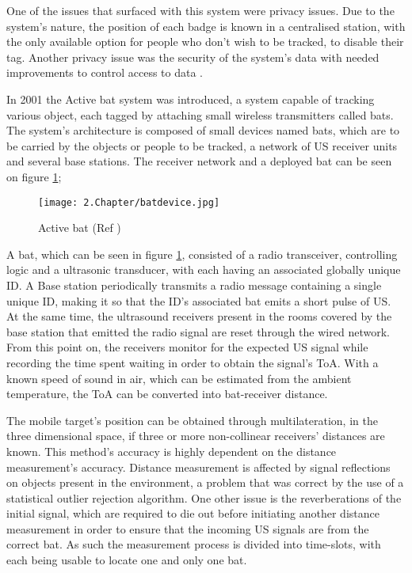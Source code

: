One of the issues that surfaced with this system were privacy issues. Due to the system's nature, the position of each badge is known in a centralised station, with the only available option for people who don't wish to be tracked, to disable their tag. Another privacy issue was the security of the system's data with needed improvements to control access to data \cite{badge1}.







\label{subsec:bat}


In 2001 the Active bat system \cite{bat}was introduced, a system capable of tracking various object, each tagged by attaching small wireless transmitters called bats. The system's architecture is composed of small devices named bats, which are to be carried by the objects or people to be tracked, a network of \acf{US} receiver units and several base stations. The receiver network and a deployed bat can be seen on figure \ref{fig:bat};

\begin{figure}[H]
	\centering
		\texttt{[image: 2.Chapter/batdevice.jpg]}
	\caption[Active bat (Ref \cite{batfig}) ]{Active bat (Ref \cite{batfig}) }
	\label{fig:bat}
\end{figure}

 A bat, which can be seen in figure \ref{fig:bat}, consisted of a radio transceiver, controlling logic and a ultrasonic transducer, with each having an associated globally unique ID. A Base station periodically transmits a radio message containing a single unique ID, making it so that the ID's associated bat emits a short pulse of \ac{US}. At the same time, the ultrasound receivers present in the rooms covered by the base station that emitted the radio signal are reset through the wired network. From this point on, the receivers monitor for the expected \ac{US} signal while recording the time spent waiting in order to obtain the signal's \ac{ToA}. With a known speed of sound in air, which can be estimated from the ambient temperature, the \ac{ToA} can be converted into bat-receiver distance.

 The mobile target's position can be obtained through multilateration, in the three dimensional space, if three or more non-collinear receivers' distances are known. This method's accuracy is highly dependent on the distance measurement's accuracy. Distance measurement is affected by signal reflections on objects present in the environment, a problem that was correct by the use of a statistical outlier rejection algorithm. One other issue is the reverberations of the initial signal, which are required to die out before initiating another distance measurement in order to ensure that the incoming \ac{US} signals are from the correct bat. As such the measurement process is divided into time-slots, with each being usable to locate one and only one bat.

